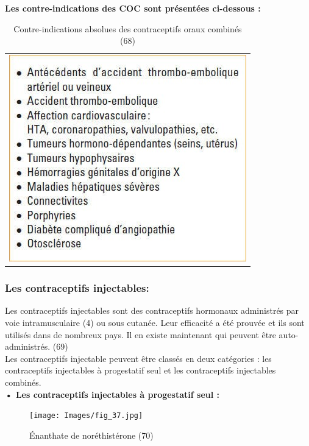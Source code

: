 \textbf{Les contre-indications des COC sont présentées ci-dessous :}

\begin{table}[H]
\centering
\begin{tabular}{c}
    \includegraphics[scale=4.2]{Images/tab_7.jpg} \\
\end{tabular}
\caption{Contre-indications absolues des contraceptifs oraux combinés (68)}
\end{table}

\subsubsection{Les contraceptifs injectables:}

Les contraceptifs injectables sont des contraceptifs hormonaux administrés par voie intramusculaire (4) ou sous cutanée. Leur efficacité a été prouvée et ils sont utilisés dans de nombreux pays. Il en existe maintenant qui peuvent être auto-administrés. (69) \\

\noindent Les contraceptifs injectable peuvent être classés en deux catégories : les contraceptifs injectables à progestatif seul et les contraceptifs injectables combinés. \\

\hspace{1em}\textbf{•	Les contraceptifs injectables à progestatif seul : }\vspace*{1em}

\begin{figure}[H]
  \centering	
  \texttt{[image: Images/fig\_37.jpg]}
  \caption{Énanthate de noréthistérone (70)}
  
\end{figure}

